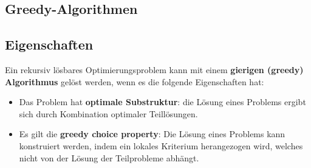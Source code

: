 \begin{sectionbox}
\section{Greedy-Algorithmen}
\subsection{Eigenschaften}
Ein rekursiv lösbares Optimierungsproblem kann mit einem \textbf{gierigen (greedy) Algorithmus} gelöst werden, wenn es die folgende Eigenschaften hat:
\begin{itemize}
    \item Das Problem hat \textbf{optimale Substruktur}: die Lösung eines Problems ergibt sich durch Kombination optimaler Teillösungen.
    \item Es gilt die \textbf{greedy choice property}: Die Lösung eines Problems kann konstruiert werden, indem ein lokales Kriterium herangezogen wird, welches nicht von der Lösung der Teilprobleme abhängt.    
\end{itemize}
\end{sectionbox}
\vspace{-4pt}
